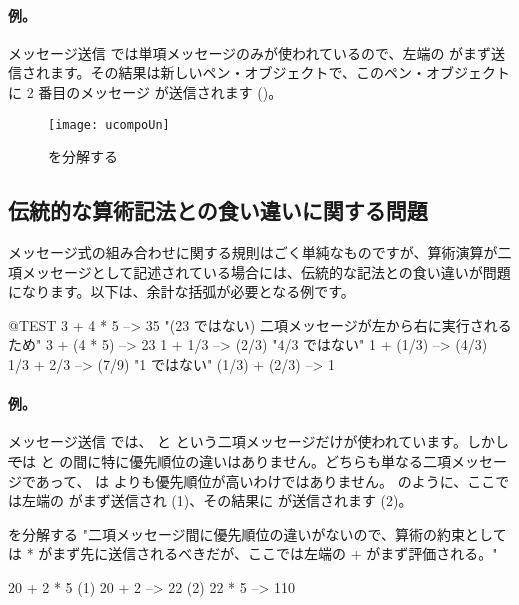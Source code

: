 \documentclass[a4paper,10pt,twoside]{book}
\begin{document}
\paragraph{例。} メッセージ送信  では単項メッセージのみが使われているので、左端の  がまず送信されます。その結果は新しいペン・オブジェクトで、このペン・オブジェクトに 2 番目のメッセージ  が送信されます ()。

\begin{figure}
	\centering
	\texttt{[image: ucompoUn]}
	\caption{ を分解する}
\end{figure}

\subsection{伝統的な算術記法との食い違いに関する問題}
メッセージ式の組み合わせに関する規則はごく単純なものですが、算術演算が二項メッセージとして記述されている場合には、伝統的な記法との食い違いが問題になります。以下は、余計な括弧が必要となる例です。

\begin{code}{@TEST}
3 + 4 * 5      --> 35    "(23 ではない)  二項メッセージが左から右に実行されるため"
3 + (4 * 5)    --> 23
1 + 1/3         --> (2/3)    "4/3 ではない"
1 + (1/3)       --> (4/3)
1/3 + 2/3       --> (7/9)    "1 ではない"
(1/3) + (2/3)  --> 1
\end{code}

\paragraph{例。}
メッセージ送信  では、\ct{+} と \ct{*} という二項メッセージだけが使われています。しかし \st では \ct{+} と \ct{*} の間に特に優先順位の違いはありません。どちらも単なる二項メッセージであって、\ct{*} は \ct{+} よりも優先順位が高いわけではありません。 のように、ここでは左端の \ct{+} がまず送信され (1)、その結果に \ct{*} が送信されます (2)。

\begin{example}[binaryMessages1]{ を分解する}{}
"二項メッセージ間に優先順位の違いがないので、算術の約束としては * がまず先に送信されるべきだが、ここでは左端の + がまず評価される。"

      20 + 2 * 5 
(1)  20 + 2 --> 22
(2)  22       * 5 --> 110
\end{example}
\end{document}
